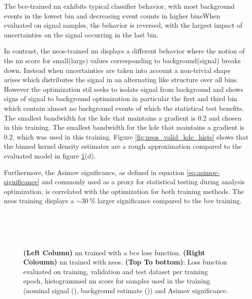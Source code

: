 The \ac{bce}-trained \ac{nn} exhibits typical classifier behavior, with most background events in the lowest bin and decreasing event counts in higher binsWhen evaluated on signal samples, the behavior is reversed, with the largest impact of uncertainties on the signal occurring in the last bin.

In contrast, the \ac{neos}-trained \ac{nn} displays a different behavior where the notion of the \ac{nn} score for small(large) values corresponding to background(signal) breaks down. Instead when uncertainties are taken into account a non-trivial shape arises which distributes the signal in an alternating like structure over all bins. However the optimization stil seeks to isolate signal from background and shows signs of signal to background optimization in particular the first and third bin which contain almost no background events of which the statistical test benefits. The smallest bandwidth for the \ac{kde} that maintains a gradient is 0.2 and chosen in this training. The smallest bandwidth for the \ac{kde} that maintains a gradient is 0.2, which was used in this training. Figure \ref{fig:neos_valid_kde_hists} shows that the binned kernel density estimates are a rough approximation compared to the evaluated model in figure \ref{fig:training_metrics_validation}(d).

Furthermore, the Asimov significance, as defined in equation \ref{eq:asimov-significance} and commonly used as a proxy for statistical testing during analysis optimization, is correlated with the optimization for both training methods. The \ac{neos} training displays a $\sim\qty[]{30}{\percent}$ larger significance compared to the \ac{bce} training.

\begin{figure}
    \centering
     \label{fig:neos_validation_loss}\\
     \\
     \\
    \caption[]{\textbf{(Left Column)} \ac{nn} trained with a \ac{bce} loss function. \textbf{(Right Coloumn)} \ac{nn} trained with \ac{neos}.  \textbf{(Top To bottom)}: Loss function evaluated on training, validation and test dataset per training epoch, histogrammed \ac{nn} score for samples used in the training (nominal signal (), background estimate ()) and Asimov significance. }
    \label{fig:training_metrics_validation}
\end{figure}


